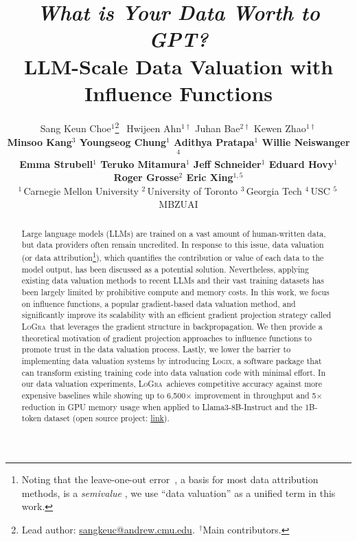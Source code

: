 \documentclass{article}
\title{\textit{What is Your Data Worth to GPT?}\\LLM-Scale Data Valuation with Influence Functions}
\author{
  \small{Sang Keun Choe$^1$\hspace{-0.3mm}\thanks{Lead author: \href{mailto:sangkeuc@andrew.cmu.edu}{sangkeuc@andrew.cmu.edu}.$\;\,^\dagger$Main contributors.}  $\;\,$Hwijeen Ahn$^{1\dagger}$ Juhan Bae$^{2\dagger}$ Kewen Zhao$^{1\dagger}$}\\[0.1ex]
  \small{\textbf{Minsoo Kang$^{3}$ Youngseog Chung$^{1}$ Adithya Pratapa$^{1}$ Willie Neiswanger$^{4}$}}\\[0.1ex]
  \small{\textbf{Emma Strubell$^{1}$ Teruko Mitamura$^{1}$ Jeff Schneider$^{1}$ Eduard Hovy$^{1}$ Roger Grosse$^{2}$ Eric Xing$^{1,5}$}}\\[0.1ex]
  \small{$^1\,$Carnegie Mellon University\hspace{0.2cm} $^2\,$University of Toronto\hspace{0.2cm} $^3\,$Georgia Tech\hspace{0.2cm} $^4\,$USC\hspace{0.2cm} $^5\,$MBZUAI}
}
\newcommand{\method}{\textsc{LoGra}}
\newcommand{\software}{\textsc{Logix}}
\begin{document}
\maketitle

\begin{abstract}
  Large language models (LLMs) are trained on a vast amount of human-written data, but data providers often remain uncredited. 
  In response to this issue, data valuation (or data attribution\footnote{Noting that the leave-one-out error~\cite{koh2017understanding}, a basis for most data attribution methods, is a \textit{semivalue} \cite{dubey1981value,kwon2021beta,wang2023data}, we use ``data valuation'' as a unified term in this work.}), which quantifies the contribution or value of each data to the model output, has been discussed as a potential solution.
  Nevertheless, applying existing data valuation methods to recent LLMs and their vast training datasets has been largely limited by prohibitive compute and memory costs.
  In this work, we focus on influence functions, a popular gradient-based data valuation method, and significantly improve its scalability with an efficient gradient projection strategy called \method\ that leverages the gradient structure in backpropagation.
  We then provide a theoretical motivation of gradient projection approaches to influence functions to promote trust in the data valuation process.
  Lastly, we lower the barrier to implementing data valuation systems by introducing \software, a software package that can transform existing training code into data valuation code with minimal effort.
  In our data valuation experiments, \method\ achieves competitive accuracy against more expensive baselines while showing up to 6,500$\times$ improvement in throughput and 5$\times$ reduction in GPU memory usage when applied to Llama3-8B-Instruct and the 1B-token dataset (open source project: \href{https://github.com/logix-project/logix}{link}).

  
\end{abstract}















\end{document}
